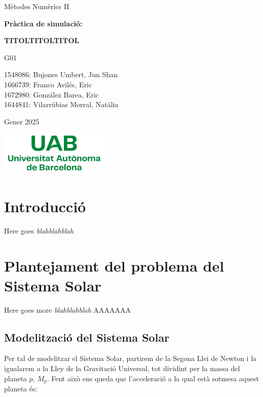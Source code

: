 \documentclass[10pt, twoside]{article}
\begin{document}
\begin{titlepage}
\centering
{\LARGE Mètodes Numèrics II \par}
\vspace{2cm}
{\Huge \textbf{Pràctica de simulació:} \par}
\vspace{1cm}
{\Huge \textbf{TITOLTITOLTITOL} \par}
\vspace{3cm}
{\Large G01 \par}
\vspace{0.5cm}
{\Large 1548086: Bujones Umbert, Jun Shan\\1666739: Franco Avilés, Eric\\  1672980: González Barea, Eric\\1644841: Vilarrúbias Morral, Natàlia \par}
\vspace{2cm}
{\Large Gener 2025 \par}
\vspace{2cm}
\includegraphics[width=0.4\textwidth]{Logo_UAB.png}


\end{titlepage}

\renewcommand{\cftsecfont}{}
\renewcommand{\cftsecpagefont}{}
\renewcommand{\cftsecleader}{\cftdotfill{\cftdotsep}}
\renewcommand{\cftdotsep}{0.2}
\setlength{\cftbeforesecskip}{0.5em}
\setlength{\cftbeforesubsecskip}{0.5em}
\tableofcontents

\newpage
{}
\setcounter{page}{1}

\pagestyle{fancy}

\section{Introducció}
Here goes \textit{blahblahblah}

\section{Plantejament del problema del Sistema Solar}
Here goes more \textit{blahblahblah}  AAAAAAA

\subsection{Modelització del Sistema Solar}
Per tal de modelitzar el Sistema Solar, partirem de la Segona Llei de Newton i la igualarem a la Lley de la Gravitació Universal, tot dividint per la massa del planeta $p$, $M_p$. Fent això ens queda que l'acceleració a la qual està sotmesa aquest planeta és:
\end{document}
